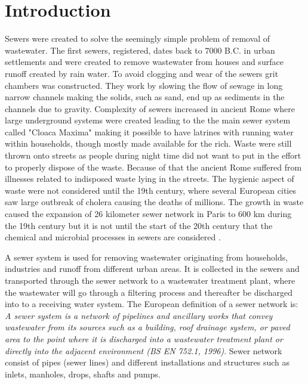\chapter{Introduction}
\label{ch:introduction}

Sewers were created to solve the seemingly simple problem of removal of wastewater. The first sewers, registered, dates back to 7000 B.C. in urban settlements and were created to remove wastewater from houses and surface runoff created by rain water. To avoid clogging and wear of the sewers grit chambers was constructed. They work by slowing the flow of sewage in long narrow channels making the solids, such as sand, end up as sediments in the channels due to gravity. Complexity of sewers increased in ancient Rome where large underground systems were created leading to the the main sewer system called "Cloaca Maxima" making it possible to have latrines with running water within households, though mostly made available for the rich.
Waste were still thrown onto streets as people during night time did not want to put in the effort to properly dispose of the waste. Because of that the ancient Rome suffered from illnesses related to indisposed waste lying in the streets. The hygienic aspect of waste were not considered until the 19th century, where several European cities saw large outbreak of cholera causing the deaths of millions. The growth in waste caused the expansion of  26 kilometer sewer network in Paris to 600 km during the 19th century but it is not until the start of the 20th century that the chemical and microbial processes in sewers are considered \cite{Sewer_processes}. 


A sewer system is used for removing wastewater originating from households, industries and runoff from different urban areas. It is collected in the sewers and transported through the sewer network to a wastewater treatment plant, where the wastewater will go through a filtering process and thereafter be discharged into to a receiving water system. The European definition of a sewer network is: \textit{A sewer system is a network of pipelines and ancillary works that convey wastewater from its sources such as a building, roof drainage system, or paved area to the point where it is discharged into a wastewater treatment plant or directly into the adjacent environment (BS EN 752.1, 1996)}. Sewer network consist of pipes (sewer lines) and different installations and structures such as inlets, manholes, drops, shafts and pumps.

